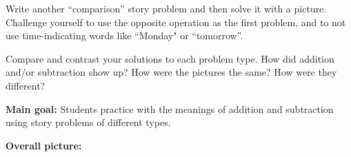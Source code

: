 \documentclass{ximera}
\begin{document}
\begin{problem}
Write another ``comparison'' story problem and then solve it with a picture. Challenge yourself to use the opposite operation as the first problem, and to not use time-indicating words like ``Monday" or ``tomorrow''.
\end{problem}

\begin{problem}
Compare and contrast your solutions to each problem type. How did addition and/or subtraction show up? How were the pictures the same? How were they different?
\end{problem}




\newpage
\begin{instructorNotes}

{\bf Main goal:} Students practice with the meanings of addition and subtraction using story problems of different types.

{\bf Overall picture:} 


\end{instructorNotes}
\end{document}
